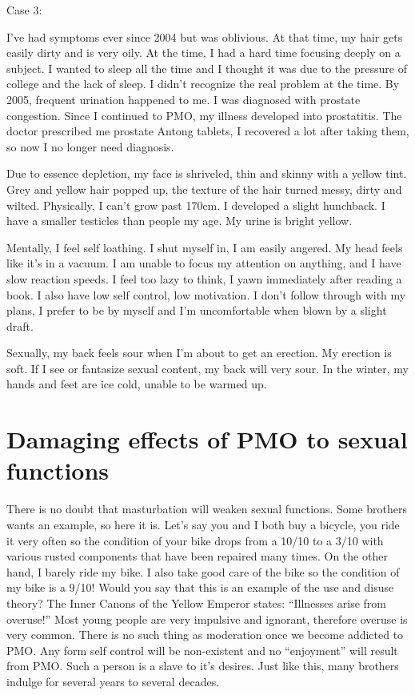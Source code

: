 \documentclass[
]{book}
\begin{document}
Case 3:

I've had symptoms ever since 2004 but was oblivious. At that time, my hair gets easily dirty and is very oily. At the time, I had a hard time focusing deeply on a subject. I wanted to sleep all the time and I thought it was due to the pressure of college and the lack of sleep. I didn't recognize the real problem at the time. By 2005, frequent urination happened to me. I was diagnosed with prostate congestion. Since I continued to PMO, my illness developed into prostatitis. The doctor prescribed me prostate Antong tablets, I recovered a lot after taking them, so now I no longer need diagnosis.

Due to essence depletion, my face is shriveled, thin and skinny with a yellow tint. Grey and yellow hair popped up, the texture of the hair turned messy, dirty and wilted. Physically, I can't grow past 170cm. I developed a slight hunchback. I have a smaller testicles than people my age. My urine is bright yellow.

Mentally, I feel self loathing. I shut myself in, I am easily angered. My head feels like it's in a vacuum. I am unable to focus my attention on anything, and I have slow reaction speeds. I feel too lazy to think, I yawn immediately after reading a book. I also have low self control, low motivation. I don't follow through with my plans, I prefer to be by myself and I'm uncomfortable when blown by a slight draft.

Sexually, my back feels sour when I'm about to get an erection. My erection is soft. If I see or fantasize sexual content, my back will very sour. In the winter, my hands and feet are ice cold, unable to be warmed up.

\hypertarget{damaging-effects-of-pmo-to-sexual-functions}{%
\section{Damaging effects of PMO to sexual functions}\label{damaging-effects-of-pmo-to-sexual-functions}}

There is no doubt that masturbation will weaken sexual functions. Some brothers wants an example, so here it is. Let's say you and I both buy a bicycle, you ride it very often so the condition of your bike drops from a 10/10 to a 3/10 with various rusted components that have been repaired many times. On the other hand, I barely ride my bike. I also take good care of the bike so the condition of my bike is a 9/10! Would you say that this is an example of the use and disuse theory? The Inner Canons of the Yellow Emperor states: ``Illnesses arise from overuse!'' Most young people are very impulsive and ignorant, therefore overuse is very common. There is no such thing as moderation once we become addicted to PMO. Any form self control will be non-existent and no ``enjoyment'' will result from PMO. Such a person is a slave to it's desires. Just like this, many brothers indulge for several years to several decades.
\end{document}
